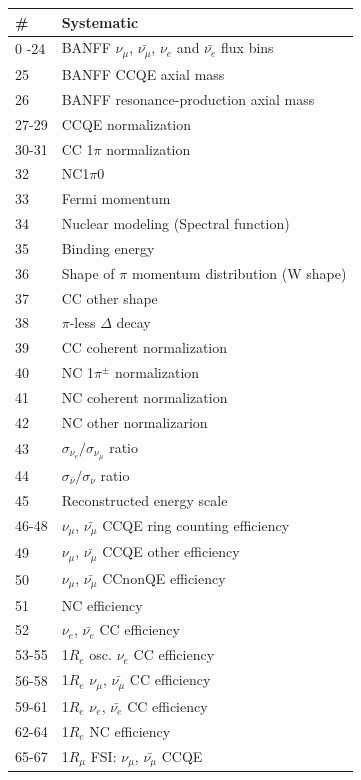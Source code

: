 \begin{table}[htbp]
\center
\begin{tabular}{|p{3cm}|p{7cm}|}
\hline 
\# & Systematic \\
\hline 
0 -24 & BANFF $\nu_{\mu}$, $\bar{\nu_{\mu}}$, $\nu_{e}$ and $\bar{\nu_{e}}$ flux bins \\
25  & BANFF CCQE axial mass \\
26 & BANFF resonance-production axial mass \\
27-29 & CCQE normalization \\
30-31 & CC 1$\pi$ normalization \\
32 & NC1$\pi0$ \\
\hline
33 & Fermi momentum \\
34 & Nuclear modeling (Spectral function) \\
35 & Binding energy \\
36 & Shape of $\pi$ momentum distribution (W shape) \\
37 & CC other shape\\
38 & $\pi$-less $\Delta$ decay\\
39 & CC coherent normalization \\
40 & NC 1$\pi^{\pm}$ normalization \\
41 & NC coherent normalization \\
42 & NC other normalizarion \\
43 & $\sigma_{\nu_{e}}/\sigma_{\nu_{\mu}}$ ratio \\
44 & $\sigma_{\bar{\nu}}/\sigma_{\nu}$ ratio \\
\hline
45 & Reconstructed energy scale \\
46-48 & $\nu_{\mu}$, $\bar{\nu_{\mu}}$ CCQE ring counting efficiency \\
49 & $\nu_{\mu}$, $\bar{\nu_{\mu}}$ CCQE other efficiency \\
50 & $\nu_{\mu}$, $\bar{\nu_{\mu}}$ CCnonQE efficiency \\
51 & NC efficiency \\
52 & $\nu_{e}$, $\bar{\nu_{e}}$ CC efficiency \\
53-55 & 1$R_{e}$ osc. $\nu_{e}$ CC efficiency \\
56-58 & 1$R_{e}$ $\nu_{\mu}$, $\bar{\nu_{\mu}}$ CC efficiency \\
59-61 & 1$R_{e}$ $\nu_{e}$, $\bar{\nu_{e}}$ CC efficiency \\
62-64 & 1$R_{e}$ NC efficiency \\
\hline
65-67 & 1$R_{\mu}$  FSI: $\nu_{\mu}$, $\bar{\nu_{\mu}}$ CCQE  \\

\end{tabular}
\end{table}
